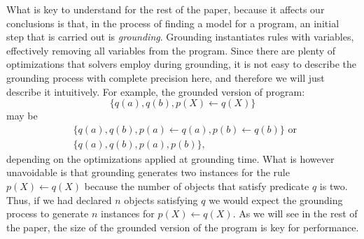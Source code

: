 What is key to understand for the rest of the paper, because it affects our conclusions is that, in the process of finding a model for a program, an initial step that is carried out is \emph{grounding}. Grounding instantiates rules with variables, effectively removing all variables from the program. Since there are plenty of optimizations that solvers employ during grounding, it is not easy to describe the grounding process with complete precision here, and therefore we will just describe it intuitively. For example, the grounded version of program:
\begin{equation}
    \{q(a),q(b),p(X)\leftarrow q(X)\}
\end{equation} may be
\begin{align*}
&\{q(a),q(b),p(a)\leftarrow q(a),p(b)\leftarrow q(b)\} \text{ or } \\
&\{q(a),q(b),p(a),p(b)\},
\end{align*}
depending on the optimizations applied at grounding time. What is however unavoidable is that grounding generates two instances for the rule $p(X)\leftarrow q(X)$ because the number of objects that satisfy predicate $q$ is two. Thus, if we had declared $n$ objects satisfying $q$ we would expect the grounding process to generate $n$ instances for $p(X)\leftarrow q(X)$. As we will see in the rest of the paper, the size of the grounded version of the program is key for performance.
